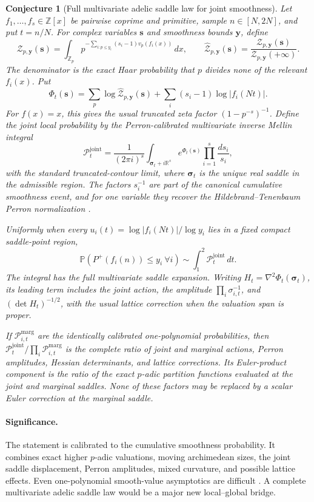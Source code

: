 \documentclass[11pt]{article}
\newtheorem{conjecture}{Conjecture}
\newcommand{\Pp}{\mathbb P}
\newcommand{\Z}{\mathbb Z}
\newcommand{\R}{\mathbb R}
\begin{document}
\begin{conjecture}[Full multivariate adelic saddle law for joint smoothness]\label{c24}
Let $f_1,\ldots,f_s\in\Z[x]$ be pairwise coprime and primitive, sample
$n\in[N,2N]$, and put $t=n/N$.  For complex variables $\mathbf s$ and smoothness bounds
$\mathbf y$, define
\[
 \mathcal Z_{p,\mathbf y}(\mathbf s)=
 \int_{\Z_p}p^{-\sum_{i:p\le y_i}(s_i-1)v_p(f_i(x))}\,dx,
 \qquad
 \widehat{\mathcal Z}_{p,\mathbf y}(\mathbf s)=
 \frac{\mathcal Z_{p,\mathbf y}(\mathbf s)}
      {\mathcal Z_{p,\mathbf y}(+\boldsymbol\infty)}.
\]
The denominator is the exact Haar probability that $p$ divides none of the relevant
$f_i(x)$.  Put
\[
 \Phi_t(\mathbf s)=
 \sum_p\log\widehat{\mathcal Z}_{p,\mathbf y}(\mathbf s)
 +\sum_i(s_i-1)\log|f_i(Nt)|.
\]
For $f(x)=x$, this gives the usual truncated zeta factor
$(1-p^{-s})^{-1}$.  Define the joint local probability by the Perron-calibrated
multivariate inverse Mellin integral
\[
 \mathscr P_t^{\mathrm{joint}}=
 \frac{1}{(2\pi i)^s}
 \int_{\boldsymbol\sigma_t+i\R^s}
 e^{\Phi_t(\mathbf s)}\prod_{i=1}^s\frac{ds_i}{s_i},
\]
with the standard truncated-contour limit, where $\boldsymbol\sigma_t$ is the unique
real saddle in the admissible region.  The factors $s_i^{-1}$ are part of the canonical
cumulative smoothness event, and for one variable they recover the
Hildebrand--Tenenbaum Perron normalization \cite{HT}.

Uniformly when every
$u_i(t)=\log|f_i(Nt)|/\log y_i$ lies in a fixed compact saddle-point region,
\[
 \Pp(P^+(f_i(n))\le y_i\ \forall i)
 \sim\int_1^2\mathscr P_t^{\mathrm{joint}}\,dt.
\]
The integral has the full multivariate saddle expansion.  Writing
$H_t=\nabla^2\Phi_t(\boldsymbol\sigma_t)$, its leading term includes the joint action,
the amplitude $\prod_i\sigma_{i,t}^{-1}$, and $(\det H_t)^{-1/2}$, with the usual
lattice correction when the valuation span is proper.

If $\mathscr P_{i,t}^{\mathrm{marg}}$ are the identically calibrated one-polynomial
probabilities, then
$\mathscr P_t^{\mathrm{joint}}/\prod_i\mathscr P_{i,t}^{\mathrm{marg}}$ is the complete
ratio of joint and marginal actions, Perron amplitudes, Hessian determinants, and lattice
corrections.  Its Euler-product component is the ratio of the exact $p$-adic partition
functions evaluated at the joint and marginal saddles.  None of these factors may be
replaced by a scalar Euler correction at the marginal saddle.
\end{conjecture}

\paragraph{Significance.}
The statement is calibrated to the cumulative smoothness probability.  It combines exact higher $p$-adic valuations, moving
archimedean sizes, the joint saddle displacement, Perron amplitudes, mixed curvature, and
possible lattice effects.  Even one-polynomial smooth-value asymptotics are difficult
\cite{MartinSmooth,Mine}.  A complete multivariate adelic saddle law would be a major new
local--global bridge.
\end{document}
